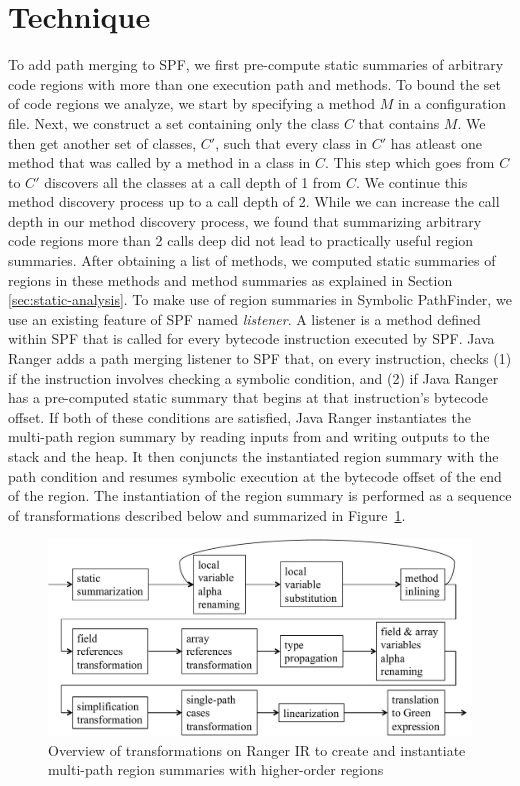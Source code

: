 \section{Technique}
%
To add path merging to SPF, we first pre-compute static summaries of arbitrary code regions with more than one execution
path and methods.
%
To bound the set of code regions we analyze, we start by specifying a method $M$ in a configuration file.
%
Next, we construct a set containing only the class $C$ that contains $M$.
%
We then get another set of classes, $C'$,
such that every class in $C'$ has atleast one method that was called by a method in a class in $C$.
%
This step which goes from $C$ to $C'$ discovers all the classes at a call depth of 1 from $C$.
%
We continue this method discovery process up to a call depth of 2.
%
While we can increase the call depth in our method discovery process, we found that summarizing
arbitrary code regions more than 2 calls deep did not lead to practically useful region summaries.
%
After obtaining a list of methods, we computed static summaries of regions in these methods and method summaries as
explained in Section \ref{sec:static-analysis}.
%
To make use of region summaries in Symbolic PathFinder, we use an existing feature of SPF named \textit{listener}.
%
A listener is a method defined within SPF that is called for every bytecode instruction executed by SPF.
%
Java Ranger adds a path merging listener to SPF that, on every instruction, checks (1) if the instruction involves
checking a symbolic condition, and (2) if Java Ranger has a pre-computed static summary that begins at that
instruction\rq s bytecode offset.
%
If both of these conditions are satisfied, Java Ranger instantiates the multi-path region summary by reading inputs from
and writing outputs to the stack and the heap.
%
It then conjuncts the instantiated region summary with the path condition and resumes symbolic execution at the
bytecode offset of the end of the region.
%
The instantiation of the region summary is performed as a sequence of transformations described below and summarized
in Figure~\ref{fig:overview}.
%
\begin{figure}[]
    \caption{Overview of transformations on Ranger IR to create and instantiate multi-path region summaries with higher-order regions}
    \label{fig:overview}
    \includegraphics[width=\textwidth]{figures/overview.pdf}
\end{figure}
